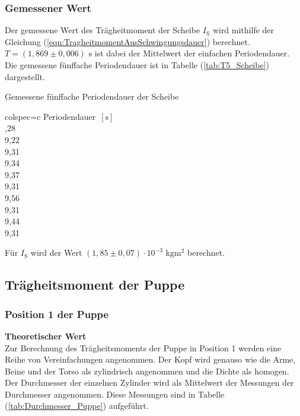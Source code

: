     \subsubsection{Gemessener Wert}
    Der gemessene Wert des Trägheitmoment der Scheibe $I_{\text{S}}$ wird mithilfe der Gleichung (\ref{eqn:TragheitmomentAusSchwingungsdauer}) berechnet.
    $T = (1,869 \pm 0,006)\,\, \unit{\second}$ ist dabei der Mittelwert der einfachen Periodendauer. Die gemessene fünffache Periodendauer ist in Tabelle (\ref{tab:T5_Scheibe}) dargestellt.
    \begin{table}[H]
      \centering 
      \caption{Gemessene fünffache Periodendauer der Scheibe}
      \label{tab:T5_Scheibe}
      \begin{tblr}{colspec={c}}
          \toprule
          Periodendauer $\,[\unit{\second}]$ \\
          ,28 \\
          9,22 \\
          9,31 \\
          9,34 \\
          9,37 \\
          9,31 \\
          9,56 \\
          9,31 \\
          9,44 \\
          9,31 \\
          \bottomrule
      \end{tblr}
    \end{table}
    Für $I_{\text{S}}$ wird der Wert $(1,85 \pm 0,07) \cdot 10^{-3} \,\,\unit{\kilo\gram\meter\squared}$ berechnet. 
     
  
  \subsection{Trägheitsmoment der Puppe}
    \subsubsection{Position 1 der Puppe}
      \textbf{Theoretischer Wert}\\
        Zur Berechnung des Trägheitsmoments der Puppe in Position 1 werden eine Reihe von Vereinfachungen angenommen. Der Kopf wird genauso
        wie die Arme, Beine und der Torso als zylindrisch angenommen und die Dichte als homogen. Der Durchmesser der einzelnen Zylinder wird 
        als Mittelwert der Messungen der Durchmesser angenommen. Diese Messungen sind in Tabelle (\ref{tab:Durchmesser_Puppe}) aufgeführt. 

